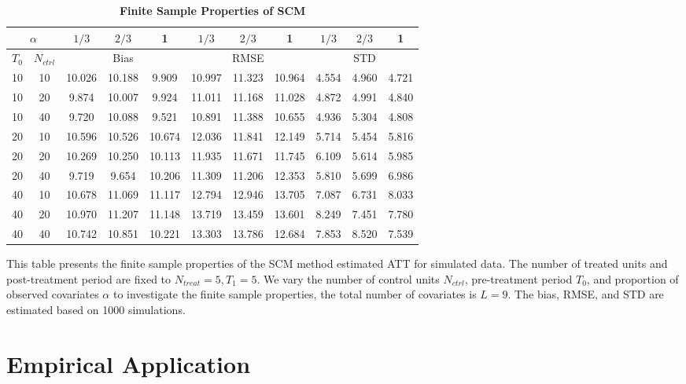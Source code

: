 \documentclass[12pt]{article}
\begin{document}
\begin{table}[!ht]
    \centering
    \caption{\textbf{Finite Sample Properties of SCM}}
    \begin{tabular}{cc|ccc|ccc|ccc}
    \toprule
    \multicolumn{2}{c|}{$\alpha$} & $1/3$ & $2/3$ & 1 & $1/3$ & $2/3$ & 1 & $1/3$ & $2/3$ & 1 \\
    \hline
    $T_0$ & $N_{ctrl}$ & \multicolumn{3}{c|}{Bias} & \multicolumn{3}{c|}{RMSE}  & \multicolumn{3}{c}{STD} \\
    \hline
    10 & 10 & 10.026 & 10.188 & 9.909 & 10.997 & 11.323 & 10.964 & 4.554 & 4.960 & 4.721 \\
    10 & 20 & 9.874 & 10.007 & 9.924 & 11.011 & 11.168 & 11.028 & 4.872 & 4.991 & 4.840 \\
    10 & 40 & 9.720 & 10.088 & 9.521 & 10.891 & 11.388 & 10.655 & 4.936 & 5.304 & 4.808 \\
\cline{1-11}
    20 & 10 & 10.596 & 10.526 & 10.674 & 12.036 & 11.841 & 12.149 & 5.714 & 5.454 & 5.816 \\
    20 & 20 & 10.269 & 10.250 & 10.113 & 11.935 & 11.671 & 11.745 & 6.109 & 5.614 & 5.985 \\
    20 & 40 & 9.719 & 9.654 & 10.206 & 11.309 & 11.206 & 12.353 & 5.810 & 5.699 & 6.986 \\
\cline{1-11}
    40 & 10 & 10.678 & 11.069 & 11.117 & 12.794 & 12.946 & 13.705 & 7.087 & 6.731 & 8.033 \\
    40 & 20 & 10.970 & 11.207 & 11.148 & 13.719 & 13.459 & 13.601 & 8.249 & 7.451 & 7.780 \\
    40 & 40 & 10.742 & 10.851 & 10.221 & 13.303 & 13.786 & 12.684 & 7.853 & 8.520 & 7.539 \\
    \bottomrule
    \end{tabular}
    \begin{tablenotes}
        \item This table presents the finite sample properties of the SCM method estimated ATT for simulated data. The number of treated units and post-treatment period are fixed to $N_{treat} = 5, T_1=5$. We vary the number of control units $N_{ctrl}$, pre-treatment period $T_0$, and proportion of observed covariates $\alpha$ to investigate the finite sample properties, the total number of covariates is $L=9$. The bias, RMSE, and STD are estimated based on 1000 simulations.
    \end{tablenotes}
    \end{table}
\section{Empirical Application}
\end{document}
